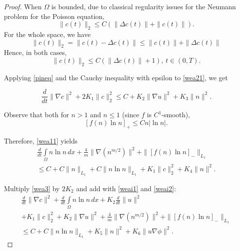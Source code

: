 \documentclass[10pt]{amsart}
\begin{document}
\begin{proof}
When $\Omega$ is bounded, due to classical regularity issues for the Neumann problem for the Poisson equation, 
\begin{equation}\label{pineq1}
\|c(t)\|_{2}\leq C (\|\Delta c(t)\|+\|c(t)\|).
\end{equation}
For the whole space, we have 
\begin{equation}\label{pineq2}
\|c(t)\|_{2}=\|c(t)-\Delta c(t)\|\leq \|c(t)\|+\|\Delta c(t)\|
\end{equation}
Hence, in both cases, \begin{equation}\label{pineq}
\|c(t)\|_{2}\leq C(\|\Delta c(t)\|+1), \ t\in (0,T).
\end{equation}

Applying \eqref{pineq} and the Cauchy inequality with epsilon  to \eqref{wea21}, we get 

\begin{equation}\label{weai1}
\frac {d}{dt} \|\nabla c\|^2 +2 K_1 \|c\|^2_2\leq C+K_2 \|\nabla u\|^2+K_3 \|n\|^2.
\end{equation}

Observe that both for $n> 1$ and $n\leq 1$ (since $f$ is $C^1$-smooth), 
\begin{equation}\label{f1}
[f(n)\ln n]_+\leq Cn |\ln n|.
\end{equation}

Therefore, \eqref{wea11} yields 
\begin{multline}\label{weai2}
\frac {d}{dt} \int\limits_{\Omega} n\ln n \, dx + \frac 4 m \|\nabla(n^{m/2})\|^2 + \|[f(n)\ln n]_-\|_{L_1} \\ \leq C+C\|n\|_{L_1}+C\|n \ln n\|_{L_1}+ K_1 \|c\|^2_2+ K_4 \|n\|^2.
\end{multline}

Multiply \eqref{wea3} by $2K_2$ and add with \eqref{weai1} and \eqref{weai2}:
\begin{multline}\label{weai3}
\frac {d}{dt} \|\nabla c\|^2 + \frac {d}{dt} \int\limits_{\Omega} n\ln n \, dx+ K_2\frac {d}{dt} \|u\|^2 \\ +K_1 \|c\|^2_2 + K_2 \|\nabla u\|^2+ \frac 4 m \|\nabla(n^{m/2})\|^2 + \|[f(n)\ln n]_-\|_{L_1} \\ \leq C+C\|n \ln n\|_{L_1}+K_5 \|n\|^2+K_6\|u \nabla \phi \|^2.
\end{multline}


\end{proof}
\end{document}
